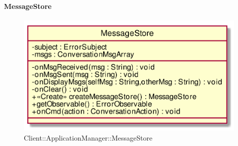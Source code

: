 \hypertarget{MessageStore_label}{\paragraph{MessageStore}}
\begin{figure}[h]
	\centering
	\includegraphics[width=\textwidth,height=\textheight,keepaspectratio]{images/ClassMessageStore.png}
	\caption{Client::ApplicationManager::MessageStore}
\end{figure}
